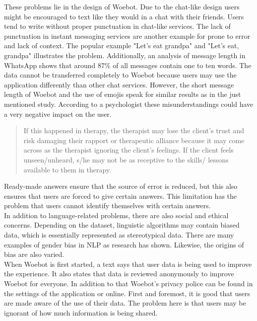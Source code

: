 These problems lie in the design of Woebot.
Due to the chat-like design users might be encouraged to text like they would in a chat with their friends.
Users tend to write without proper punctuation in chat-like services\cite{punctuation}.
The lack of punctuation in instant messaging services are another example for prone to error and lack of context.
The popular example "Let's eat grandpa" and "Let's eat, grandpa" illustrates the problem.
Additionally, an analysis of message length in WhatsApp shows that around 87\% of all messages contain one to ten words\cite{whatsapp-usage}.
The data cannot be transferred completely to Woebot because users may use the application differently than other chat services.
However, the short message length of Woebot and the use of emojis speak for similar results as in the just mentioned study.
According to a psychologist these misunderstandings could have a very negative impact on the user.

\begin{quote}
    If this happened in therapy, the therapist may lose the client's trust and risk damaging their rapport or therapeutic alliance because it may come across as the therapist ignoring the client's feelings.
    If the client feels unseen/unheard, s/he may not be as receptive to the skills/ lessons available to them in therapy\cite{investigating-students}.
\end{quote}

Ready-made answers ensure that the source of error is reduced, but this also ensures that users are forced to give certain answers.
This limitation has the problem that users cannot identify themselves with certain answers\cite{emoticons}.\\

In addition to language-related problems, there are also social and ethical concerns.
Depending on the dataset, linguistic algorithms may contain biased data, which is essentially represented as stereotypical data.
There are many examples of gender bias in NLP as research has shown\cite{gender-bias-nlp}.
Likewise, the origins of bias are also varied\cite{sources-bias-nlp}.\\

When Woebot is first started, a text says that user data is being used to improve the experience.
It also states that data is reviewed anonymously to improve Woebot for everyone.
In addition to that Woebot's privacy police can be found in the settings of the application or online\cite{woebot-privacy}.
First and foremost, it is good that users are made aware of the use of their data.
The problem here is that users may be ignorant of how much information is being shared.\\

